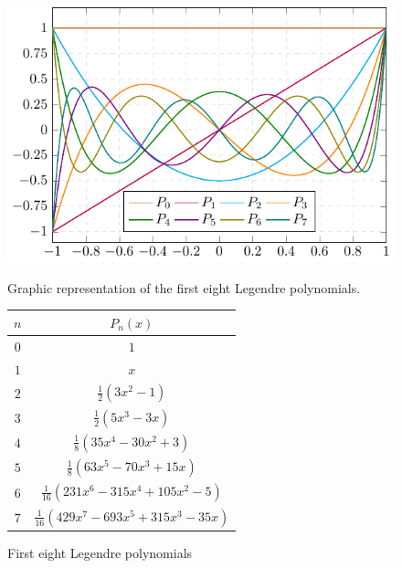 \documentclass[../main.tex]{subfiles}
\begin{document}
\begin{figure}[ht]
  \centering
  \begin{minipage}[ht]{0.48\textwidth}
    \centering
    \includegraphics[width=\textwidth]{Images/legendre.pdf}
    \caption{Graphic representation of the first eight Legendre polynomials.}
  \end{minipage}
  \hfill
  \begin{minipage}[ht]{0.48\textwidth}
    \centering
    \captionsetup{type=table} %
    \begin{tabular}{c|c}
      $n$ & $P_n(x)$                                 \\
      \hline\hline
      $0$ & $1$                                      \\
      $1$ & $x$                                      \\
      $2$ & $\frac{1}{2}(3x^2-1)$                    \\
      $3$ & $\frac{1}{2}(5x^3-3x)$                   \\
      $4$ & $\frac{1}{8}(35x^4-30x^2+3)$             \\
      $5$ & $\frac{1}{8}(63x^5-70x^3+15x)$           \\
      $6$ & $\frac{1}{16}(231x^6-315x^4+105x^2-5)$   \\
      $7$ & $\frac{1}{16}(429x^7-693x^5+315x^3-35x)$ \\
    \end{tabular}
    \caption{First eight Legendre polynomials}
    \label{tab:legendre_polys}
  \end{minipage}
\end{figure}
\end{document}
